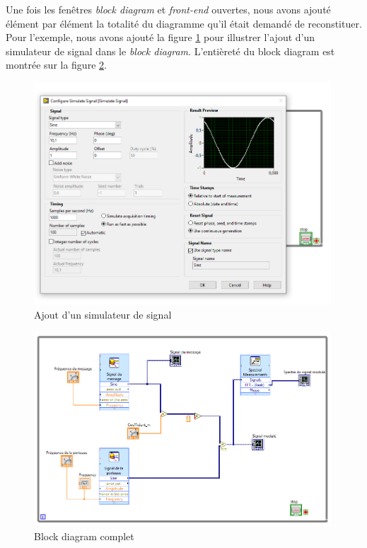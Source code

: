 \documentclass[a4paper]{article}
\begin{document}
Une fois les fenêtres \textit{block diagram} et \textit{front-end} ouvertes, nous avons ajouté élément par élément la totalité du diagramme qu'il était demandé de reconstituer. Pour l'exemple, nous avons ajouté la figure \ref{fig:f1} pour illustrer l'ajout d'un simulateur de signal dans le \textit{block diagram}. L'entièreté du block diagram est montrée sur la figure \ref{fig:f2}.

\begin{figure}[H]
    \centering
    \includegraphics[width=0.99\textwidth]{images/Capture001.PNG}
    \caption{Ajout d'un simulateur de signal}
    \label{fig:f1}
\end{figure}

\begin{figure}[H]
    \centering
    \includegraphics[width=0.99\textwidth]{images/Capture003.PNG}
    \caption{Block diagram complet}
    \label{fig:f2}
\end{figure}
\end{document}
